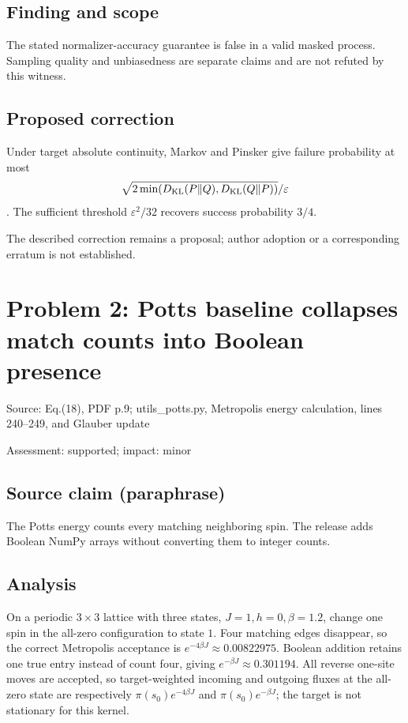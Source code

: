 \documentclass[11pt]{article}
\begin{document}
\subsection*{Finding and scope}

The stated normalizer-accuracy guarantee is false in a valid masked process. Sampling quality and unbiasedness are separate claims and are not refuted by this witness.

\subsection*{Proposed correction}

Under target absolute continuity, Markov and Pinsker give failure probability at most \[\sqrt{2\min(D_{\rm KL}(P\Vert Q),D_{\rm KL}(Q\Vert P))}/\varepsilon\]. The sufficient threshold \(\varepsilon^2/32\) recovers success probability \(3/4\).

The described correction remains a proposal; author adoption or a corresponding erratum is not established.

\section*{Problem 2: Potts baseline collapses match counts into Boolean presence}

Source: Eq.(18), PDF p.9; utils\_potts.py, Metropolis energy calculation, lines 240–249, and Glauber update

Assessment: supported; impact: minor

\subsection*{Source claim (paraphrase)}

The Potts energy counts every matching neighboring spin. The release adds Boolean NumPy arrays without converting them to integer counts.

\subsection*{Analysis}

On a periodic \(3\times3\) lattice with three states, \(J=1,h=0,\beta=1.2\), change one spin in the all-zero configuration to state \(1\). Four matching edges disappear, so the correct Metropolis acceptance is \(e^{-4\beta J}\approx0.00822975\). Boolean addition retains one true entry instead of count four, giving \(e^{-\beta J}\approx0.301194\). All reverse one-site moves are accepted, so target-weighted incoming and outgoing fluxes at the all-zero state are respectively \(\pi(s_0)e^{-4\beta J}\) and \(\pi(s_0)e^{-\beta J}\); the target is not stationary for this kernel.
\end{document}
